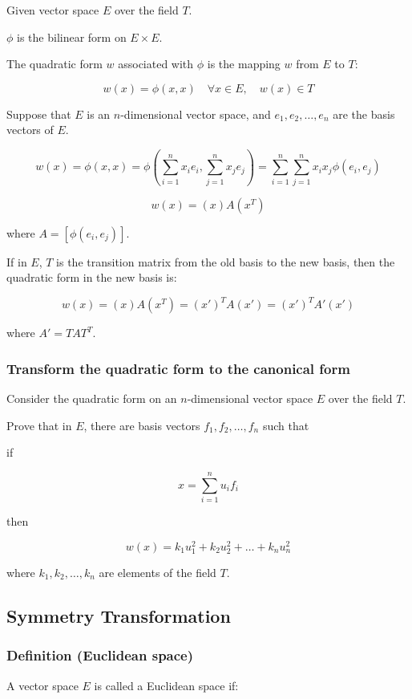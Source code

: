 Given vector space $E$ over the field $T$.

$\phi$ is the bilinear form on $E \times E$.

The quadratic form $w$ associated with $\phi$ is the mapping $w$ from $E$ to $T$:

\[
w(x) = \phi(x, x) \quad \forall x \in E, \quad w(x) \in T
\]

Suppose that $E$ is an $n$-dimensional vector space, and $e_1, e_2, \ldots, e_n$ are the basis vectors of $E$.

\[
w(x) = \phi(x, x) = \phi\left(\sum_{i=1}^n x_i e_i, \sum_{j=1}^n x_j e_j\right) = \sum_{i=1}^n \sum_{j=1}^n x_i x_j \phi(e_i, e_j)
\]

\[
w(x) = (x) A (x^T)
\]

where $A = [\phi(e_i, e_j)]$.

If in $E$, $T$ is the transition matrix from the old basis to the new basis, then the quadratic form in the new basis is:

\[
w(x) = (x) A (x^T) = (x')^T A (x') = (x')^T A' (x')
\]

where $A' = T A T^T$.


\subsubsection{Transform the quadratic form to the canonical form}

Consider the quadratic form on an $n$-dimensional vector space $E$ over the field $T$.

Prove that in $E$, there are basis vectors $f_1, f_2, \ldots, f_n$ such that

if

\[
x = \sum_{i=1}^n u_i f_i
\]

then

\[
w(x) = k_1 u_1^2 + k_2 u_2^2 + \ldots + k_n u_n^2
\]

where $k_1, k_2, \ldots, k_n$ are elements of the field $T$.




\subsection{Symmetry Transformation}

\subsubsection{Definition (Euclidean space)}

A vector space $E$ is called a Euclidean space if:

